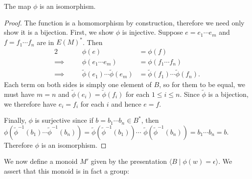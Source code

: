\documentclass[noindex,noinsetproof,12pt]{lmaths}
\begin{document}
\begin{lemma}
	The map $\phi$ is an isomorphism. \label{lma:phi-isomorphism}
\end{lemma}
\begin{proof}
	The function is a homomorphism by construction, therefore we need only show it is a bijection. First, we show $\phi$ is injective. Suppose $e = e_1\cdots e_m$ and $f = f_1\cdots f_n$ are in $E(M)^*$. Then
	\begin{alignat*}{2}
		&& \phi(e) &= \phi(f) \\
		\implies\quad&& \phi(e_1 \cdots e_m) &= \phi(f_1 \cdots f_n) \\
		\implies\quad&& \tilde\phi(e_1)\cdots\tilde\phi(e_m) &= \tilde\phi(f_1)\cdots\tilde\phi(f_n).
	\end{alignat*}
	Each term on both sides is simply one element of $B$, so for them to be equal, we must have $m = n$ and $\tilde\phi(e_i) = \tilde\phi(f_i)$ for each $1 \le i \le n$. Since $\tilde\phi$ is a bijection, we therefore have $e_i = f_i$ for each $i$ and hence $e = f$.

	Finally, $\phi$ is surjective since if $b = b_1 \cdots b_n \in B^*$, then $\phi(\tilde\phi^{-1}(b_1) \cdots \tilde\phi^{-1}(b_n)) = \tilde\phi(\tilde\phi^{-1}(b_1)) \cdots$ $\tilde\phi(\tilde\phi^{-1}(b_n)) = b_1$$\cdots b_n = b$. Therefore $\phi$ is an isomorphism.
\end{proof}

We now define a monoid $M'$ given by the presentation $\langle B \mid \phi(w) = \epsilon \rangle$. We assert that this monoid is in fact a group:
\end{document}
